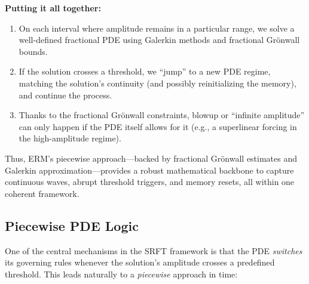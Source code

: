\documentclass[12pt]{article}
\begin{document}
\medskip

\noindent
\textbf{Putting it all together:}
\begin{enumerate}
    \item On each interval where amplitude remains in a particular range, we
          solve a well-defined fractional PDE using Galerkin methods and
          fractional Grönwall bounds.
    \item If the solution crosses a threshold, we “jump” to a new PDE regime,
          matching the solution’s continuity (and possibly reinitializing the
          memory), and continue the process.
    \item Thanks to the fractional Grönwall constraints, blowup or “infinite
          amplitude” can only happen if the PDE itself allows for it (e.g., a
          superlinear forcing in the high-amplitude regime).
\end{enumerate}

Thus, ERM’s piecewise approach—backed by fractional Grönwall estimates and
Galerkin approximation—provides a robust mathematical backbone to capture
continuous waves, abrupt threshold triggers, and memory resets, all within one
coherent framework.

\subsection{Piecewise PDE Logic}
\label{subsec:piecewise_pde_logic}

One of the central mechanisms in the SRFT framework is that the PDE \emph{switches} 
its governing rules whenever the solution’s amplitude crosses a predefined threshold. 
This leads naturally to a \emph{piecewise} approach in time:
\end{document}
